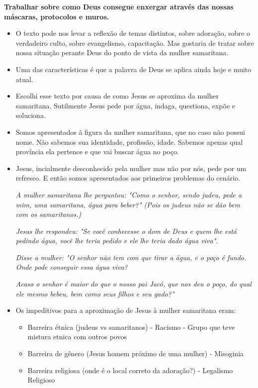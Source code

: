 \documentclass[12pt, legalpaper]{article}
\begin{document}
\textbf{Trabalhar sobre como Deus consegue enxergar através das nossas máscaras, protocolos e muros.}
\begin{itemize}
   \item O texto pode nos levar a reflexão de temas distintos, sobre adoração, sobre o verdadeiro culto, sobre evangelismo, capacitação. Mas gostaria de tratar sobre nossa situação perante Deus do ponto de vista da mulher samaritana.
   
   \item Uma das características é que a palavra de Deus se aplica ainda hoje e muito atual.
   
   \item Escolhi esse texto por causa de como Jesus se aproxima da mulher samaritana. Sutilmente Jesus pede por água, indaga, questiona, expõe e soluciona.

   \item Somos apresentados ã figura da mulher samaritana, que no caso não possui nome. Não sabemos sua identidade, profissão, idade. Sabemos apenas qual província ela pertence e que vai buscar água no poço.

   \item Jesus, incialmente desconhecido pela mulher mas não por nós, pede por um refresco. E então somos apresentados aos primeiros problemas do cenário.   
  
   \emph{A mulher samaritana lhe perguntou: "Como o senhor, sendo judeu, pede a mim, uma samaritana, água para beber?" (Pois os judeus não se dão bem com os samaritanos.)}

   \emph{Jesus lhe respondeu: "Se você conhecesse o dom de Deus e quem lhe está pedindo água, você lhe teria pedido e ele lhe teria dado água viva".}

   \emph{Disse a mulher: "O senhor não tem com que tirar a água, e o poço é fundo. Onde pode conseguir essa água viva?}

   \emph{Acaso o senhor é maior do que o nosso pai Jacó, que nos deu o poço, do qual ele mesmo bebeu, bem como seus filhos e seu gado?"}


   \newpage
   \item Os impeditivos para a aproximação de Jesus à mulher samaritana eram:
   \begin{itemize}
      \item Barreira étnica (judeus vs samaritanos) - Racismo - Grupo que teve mistura etnica com outros povos
      \item Barreira de gênero (Jesus homem próximo de uma mulher) - Misoginia
      \item Barreira religiosa (onde é o local correto da adoração?) - Legalismo Religioso
   \end{itemize}


\end{itemize}
\end{document}
